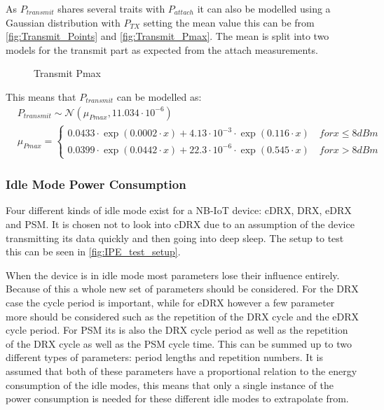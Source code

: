 As $P_{transmit}$ shares several traits with $P_{attach}$ it can also be modelled using a Gaussian distribution with $P_{TX}$ setting the mean value this can be from \autoref{fig:Transmit_Points} and \autoref{fig:Transmit_Pmax}. The mean is split into two models for the transmit part as expected from the attach measurements. 

\begin{figure}[H]
\centering
\resizebox{0.7\textwidth}{!}{
}
\caption{Transmit Pmax}
\label{fig:Transmit_Pmax}
\end{figure}

This means that $P_{transmit}$ can be modelled as:
\begin{align}
&P_{transmit} \sim \mathcal{N}(\mu_{Pmax},11.034\cdot 10^{-6}) \\ \nonumber
&\mu_{Pmax} = \begin{cases} 0.0433\cdot\exp{(0.0002\cdot x)} + 4.13\cdot10^{-3}\cdot\exp{(0.116\cdot x)} \quad for x \leq 8 dBm \\
0.0399\cdot\exp{(0.0442\cdot x)} + 22.3\cdot10^{-6}\cdot\exp{(0.545\cdot x)} \quad for x > 8 dBm \end{cases}
\end{align}


\subsubsection{Idle Mode Power Consumption}
Four different kinds of idle mode exist for a NB-IoT device: \gls{cDRX}, \gls{DRX}, \gls{eDRX} and \gls{PSM}. It is chosen not to look into \gls{cDRX} due to an assumption of the device transmitting its data quickly and then going into deep sleep. The setup to test this can be seen in \autoref{fig:IPE_test_setup}.

When the device is in idle mode most parameters lose their influence entirely. Because of this a whole new set of parameters should be considered. For the \gls{DRX} case the cycle period is important, while for \gls{eDRX} however a few parameter more should be considered such as the repetition of the DRX cycle and the eDRX cycle period. For \gls{PSM} its is also the DRX cycle period as well as the repetition of the DRX cycle as well as the PSM cycle time. This can be summed up to two different types of parameters: period lengths and repetition numbers. It is assumed that both of these parameters have a proportional relation to the energy consumption of the idle modes, this means that only a single instance of the power consumption is needed for these different idle modes to extrapolate from.

